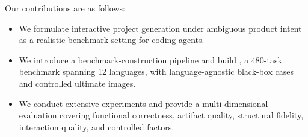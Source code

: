 

Our contributions are as follows:

\begin{itemize}
    \item We formulate interactive project generation under ambiguous product intent as a realistic benchmark setting for coding agents.
    \item We introduce a benchmark-construction pipeline and build \rcb{}, a 480-task benchmark spanning 12 languages, with language-agnostic black-box cases and controlled ultimate images.
    \item We conduct extensive experiments and provide a multi-dimensional evaluation covering functional correctness, artifact quality, structural fidelity, interaction quality, and controlled factors.
\end{itemize}

